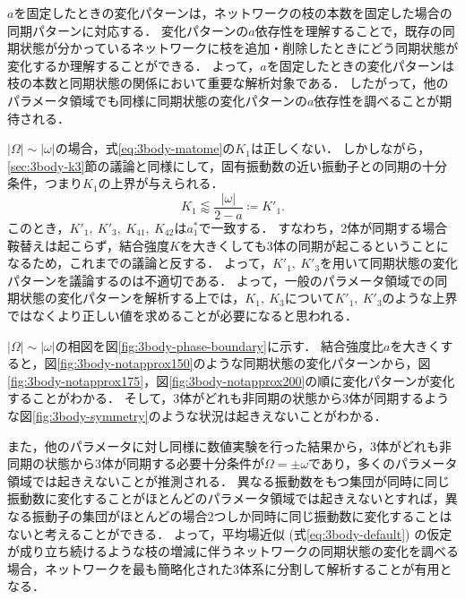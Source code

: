 \documentclass[../main]{subfiles}
\begin{document}
$a$を固定したときの変化パターンは，ネットワークの枝の本数を固定した場合の同期パターンに対応する．
変化パターンの$a$依存性を理解することで，既存の同期状態が分かっているネットワークに枝を追加・削除したときにどう同期状態が変化するか理解することができる．
よって，$a$を固定したときの変化パターンは枝の本数と同期状態の関係において重要な解析対象である．
したがって，他のパラメータ領域でも同様に同期状態の変化パターンの$a$依存性を調べることが期待される．

$|\Omega|\sim|\omega|$の場合，式\eqref{eq:3body-matome}の$K_1$は正しくない．
しかしながら，\ref{sec:3body-k3}節の議論と同様にして，固有振動数の近い振動子との同期の十分条件，つまり$K_1$の上界が与えられる．
\begin{equation}
    \label{K1-approx-dash}
    K_1\lessapprox\frac{|\omega|}{2-a}\coloneqq K'_1.
\end{equation}
このとき，$K'_1,\ K'_3,\ K_{41},\ K_{42}$は$a^\ast_1$で一致する．
すなわち，2体が同期する場合鞍替えは起こらず，結合強度$K$を大きくしても3体の同期が起こるということになるため，これまでの議論と反する．
よって，$K'_1,\ K'_3$を用いて同期状態の変化パターンを議論するのは不適切である．
よって，一般のパラメータ領域での同期状態の変化パターンを解析する上では，$K_1,\ K_3$について$K'_1,\ K'_3$のような上界ではなくより正しい値を求めることが必要になると思われる．

$|\Omega|\sim|\omega|$の相図を図\ref{fig:3body-phase-boundary}に示す．
結合強度比$a$を大きくすると，図\ref{fig:3body-notapprox150}のような同期状態の変化パターンから，図\ref{fig:3body-notapprox175}，図\ref{fig:3body-notapprox200}の順に変化パターンが変化することがわかる．
そして，3体がどれも非同期の状態から3体が同期するような図\ref{fig:3body-symmetry}のような状況は起きえないことがわかる．

また，他のパラメータに対し同様に数値実験を行った結果から，3体がどれも非同期の状態から3体が同期する必要十分条件が$\Omega=\pm\omega$であり，多くのパラメータ領域では起きえないことが推測される．
異なる振動数をもつ集団が同時に同じ振動数に変化することがほとんどのパラメータ領域では起きえないとすれば，異なる振動子の集団がほとんどの場合2つしか同時に同じ振動数に変化することはないと考えることができる．
よって，平均場近似 (式\eqref{eq:3body-default}) の仮定が成り立ち続けるような枝の増減に伴うネットワークの同期状態の変化を調べる場合，ネットワークを最も簡略化された3体系に分割して解析することが有用となる．
\end{document}
